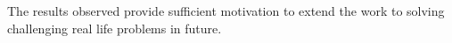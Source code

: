 The results observed provide sufficient motivation to extend the work to solving challenging real life problems in future. 










